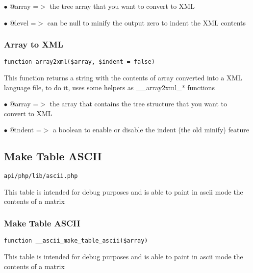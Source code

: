 \documentclass[a4paper]{article}
\begin{document}
\begin{compactitem}
\item[\color{myblue}$\bullet$] @array =$>$ the tree array that you want to convert to XML
\item[\color{myblue}$\bullet$] @level =$>$ can be null to minify the output zero to indent the XML contents
\end{compactitem}

\hypertarget{toc371}{}
\subsubsection{Array to XML}

\begin{lstlisting}
function array2xml($array, $indent = false)
\end{lstlisting}

This function returns a string with the contents of array converted into a XML
language file, to do it, uses some helpers as \_\_array2xml\_* functions

\begin{compactitem}
\item[\color{myblue}$\bullet$] @array  =$>$ the array that contains the tree structure that you want to convert to XML
\item[\color{myblue}$\bullet$] @indent =$>$ a boolean to enable or disable the indent (the old minify) feature
\end{compactitem}

\hypertarget{toc372}{}
\subsection{Make Table ASCII}

\begin{lstlisting}
api/php/lib/ascii.php
\end{lstlisting}

This table is intended for debug purposes and is able to paint in ascii
mode the contents of a matrix

\hypertarget{toc373}{}
\subsubsection{Make Table ASCII}

\begin{lstlisting}
function __ascii_make_table_ascii($array)
\end{lstlisting}

This table is intended for debug purposes and is able to paint in ascii
mode the contents of a matrix
\end{document}
